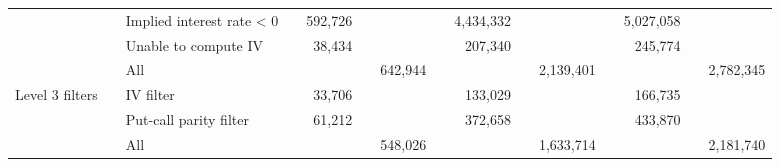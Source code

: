 \begin{tabular}{*{4}{l} *{11}{r} }
				  & & Implied interest rate < 0 & &
				592,726 & &  & &
				4,434,332 & &  & &
				5,027,058 & &  \\
			
				  & & Unable to compute IV & &
				38,434 & &  & &
				207,340 & &  & &
				245,774 & &  \\
			
				  & & All & &
				 & & 642,944 & &
				 & & 2,139,401 & &
				 & & 2,782,345 \\
			
				Level 3 filters & & IV filter & &
				33,706 & &  & &
				133,029 & &  & &
				166,735 & &  \\
			
				  & & Put-call parity filter & &
				61,212 & &  & &
				372,658 & &  & &
				433,870 & &  \\
			
				  & & All & &
				 & & 548,026 & &
				 & & 1,633,714 & &
				 & & 2,181,740 \\
			

	        \hline
	    \end{tabular}
	